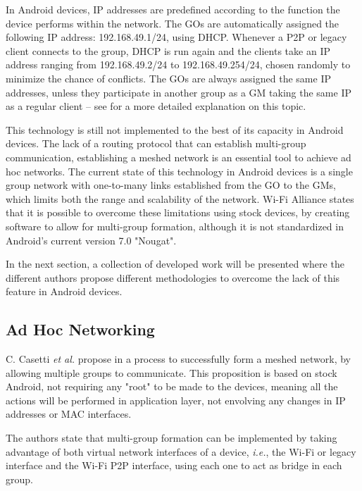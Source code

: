 In Android devices, \gls{IP} addresses are predefined according to the function the device performs within the network. The \glspl{GO} are automatically assigned the following \gls{IP} address: 192.168.49.1/24, using \gls{DHCP}. Whenever a P2P or legacy client connects to the group, \gls{DHCP} is run again and the clients take an \gls{IP} address ranging from 192.168.49.2/24 to 192.168.49.254/24, chosen randomly to minimize the chance of conflicts. The \glspl{GO} are always assigned the same \gls{IP} addresses, unless they participate in another group as a \gls{GM} taking the same \gls{IP} as a regular client -- see \cite{routeMultiGroup} for a more detailed explanation on this topic.

This technology is still not implemented to the best of its capacity in Android devices. The lack of a routing protocol that can establish multi-group communication, establishing a meshed network is an essential tool to achieve ad hoc networks. The current state of this technology in Android devices is a single group network with one-to-many links established from the \gls{GO} to the \glspl{GM}, which limits both the range and scalability of the network. Wi-Fi Alliance states that it is possible to overcome these limitations using stock devices, by creating software to allow for multi-group formation, although it is not standardized in Android's current version 7.0 "Nougat".

In the next section, a collection of developed work will be presented where the different authors propose different methodologies to overcome the lack of this feature in Android devices.

\subsection{Ad Hoc Networking}
\label{subsection:adhocnet}

C. Casetti \textit{et al.} propose in \cite{routeMultiGroup} a process to successfully form a meshed network, by allowing multiple groups to communicate. This proposition is based on stock Android, not requiring any "root" to be made to the devices, meaning all the actions will be performed in application layer, not envolving any changes in \gls{IP} addresses or \gls{MAC} interfaces.

The authors state that multi-group formation can be implemented by taking advantage of both virtual network interfaces of a device, \textit{i.e.}, the Wi-Fi or legacy interface and the Wi-Fi P2P interface, using each one to act as bridge in each group.

